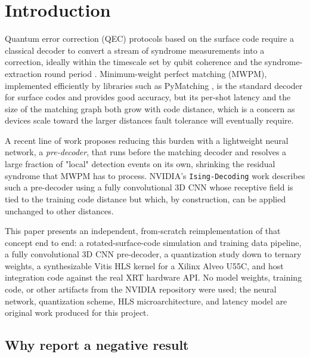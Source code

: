 \documentclass[pdflatex,sn-basic]{sn-jnl}
\begin{document}

\maketitle

\section{Introduction}\label{sec:introduction}

Quantum error correction (QEC) protocols based on the surface code require a classical decoder to convert a stream of syndrome measurements into a correction, ideally within the timescale set by qubit coherence and the syndrome-extraction round period \cite{fowler2012surface}. Minimum-weight perfect matching (MWPM), implemented efficiently by libraries such as PyMatching \cite{higgott2022pymatching}, is the standard decoder for surface codes and provides good accuracy, but its per-shot latency and the size of the matching graph both grow with code distance, which is a concern as devices scale toward the larger distances fault tolerance will eventually require.

A recent line of work proposes reducing this burden with a lightweight neural network, a \emph{pre-decoder}, that runs before the matching decoder and resolves a large fraction of "local" detection events on its own, shrinking the residual syndrome that MWPM has to process. NVIDIA's \texttt{Ising-Decoding} work \cite{chamberland2026fast} describes such a pre-decoder using a fully convolutional 3D CNN whose receptive field is tied to the training code distance but which, by construction, can be applied unchanged to other distances.

This paper presents an independent, from-scratch reimplementation of that concept end to end: a rotated-surface-code simulation and training data pipeline, a fully convolutional 3D CNN pre-decoder, a quantization study down to ternary weights, a synthesizable Vitis HLS kernel for a Xilinx Alveo U55C, and host integration code against the real XRT hardware API. No model weights, training code, or other artifacts from the NVIDIA repository were used; the neural network, quantization scheme, HLS microarchitecture, and latency model are original work produced for this project.

\subsection{Why report a negative result}\label{subsec:why-negative}
\end{document}
